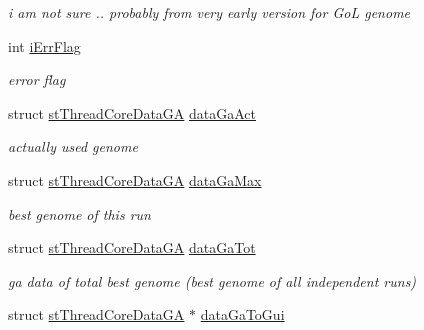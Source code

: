 \begin{DoxyCompactItemize}
\begin{DoxyCompactList}\small\item\em i am not sure .. probably from very early version for GoL genome \item\end{DoxyCompactList}\item 
\hypertarget{classCThreadCore_a1104adbe15044f2acc27d3a433242fa0}{
int \hyperlink{classCThreadCore_a1104adbe15044f2acc27d3a433242fa0}{iErrFlag}}
\label{classCThreadCore_a1104adbe15044f2acc27d3a433242fa0}

\begin{DoxyCompactList}\small\item\em error flag \item\end{DoxyCompactList}\item 
\hypertarget{classCThreadCore_a68a415431dad357abc1f4d2f09fd7758}{
struct \hyperlink{structstThreadCoreDataGA}{stThreadCoreDataGA} \hyperlink{classCThreadCore_a68a415431dad357abc1f4d2f09fd7758}{dataGaAct}}
\label{classCThreadCore_a68a415431dad357abc1f4d2f09fd7758}

\begin{DoxyCompactList}\small\item\em actually used genome \item\end{DoxyCompactList}\item 
\hypertarget{classCThreadCore_ae4a6c06b235fd91b91e54a1700f72607}{
struct \hyperlink{structstThreadCoreDataGA}{stThreadCoreDataGA} \hyperlink{classCThreadCore_ae4a6c06b235fd91b91e54a1700f72607}{dataGaMax}}
\label{classCThreadCore_ae4a6c06b235fd91b91e54a1700f72607}

\begin{DoxyCompactList}\small\item\em best genome of this run \item\end{DoxyCompactList}\item 
\hypertarget{classCThreadCore_abd1b12027b0f0472b446de0d87b8081f}{
struct \hyperlink{structstThreadCoreDataGA}{stThreadCoreDataGA} \hyperlink{classCThreadCore_abd1b12027b0f0472b446de0d87b8081f}{dataGaTot}}
\label{classCThreadCore_abd1b12027b0f0472b446de0d87b8081f}

\begin{DoxyCompactList}\small\item\em ga data of total best genome (best genome of all independent runs) \item\end{DoxyCompactList}\item 
\hypertarget{classCThreadCore_a6e090ebaca99c35e652d47f9fbaabe93}{
struct \hyperlink{structstThreadCoreDataGA}{stThreadCoreDataGA} $\ast$ \hyperlink{classCThreadCore_a6e090ebaca99c35e652d47f9fbaabe93}{dataGaToGui}}
\label{classCThreadCore_a6e090ebaca99c35e652d47f9fbaabe93}


\end{DoxyCompactItemize}
